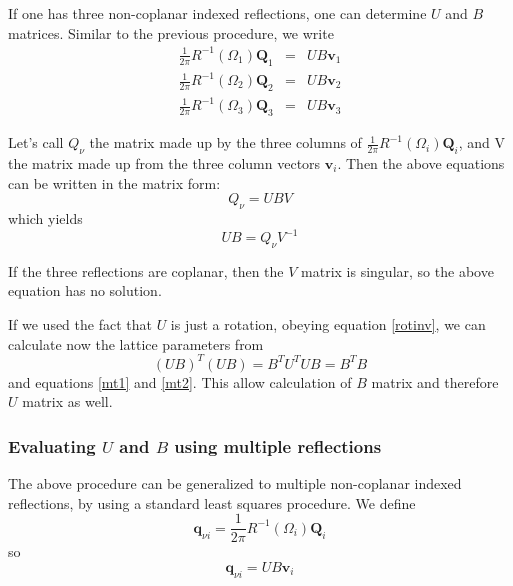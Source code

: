 \documentclass[prb]{revtex4}%
\begin{document}
If one has three non-coplanar indexed reflections, one can determine $U$ and $B$ matrices.
Similar to the previous procedure, we write
\begin{eqnarray}
  \frac{1}{2 \pi} R^{-1}(\Omega_1)\textbf{Q}_1 &=&   U B \textbf{v}_1 \\
  \frac{1}{2 \pi} R^{-1}(\Omega_2)\textbf{Q}_2 &=&   U B \textbf{v}_2 \\
  \frac{1}{2 \pi} R^{-1}(\Omega_3)\textbf{Q}_3 &=&   U B \textbf{v}_3
\end{eqnarray}

Let's call $Q_{\nu}$ the matrix made up by the three columns of $\frac{1}{2 \pi} R^{-1}(\Omega_i)\textbf{Q}_i$,
and V the matrix made up from the three column vectors $\textbf{v}_i$. Then the above equations
can be written in the matrix form:
\begin{equation}
   Q_{\nu} = U B V
\end{equation}
which yields
\begin{equation}
   U B = Q_{\nu}V^{-1}
\end{equation}

If the three reflections are coplanar, then the $V$ matrix is singular, so the above equation has
no solution.

If we used the fact that $U$ is just a rotation, obeying equation
\ref{rotinv}, we can calculate now the lattice parameters from
\begin{equation}
    (U B)^T (U B) = B^T U^T U B = B^T B
\end{equation}
and equations \ref{mt1} and \ref{mt2}. This allow calculation of $B$ matrix and therefore $U$ matrix as well.


\subsubsection{Evaluating $U$ and $B$ using multiple reflections}

The above procedure can be generalized to multiple non-coplanar indexed reflections, by using a
standard least squares procedure. We define
\begin{equation}
    \textbf{q}_{\nu i} = \frac{1}{2 \pi} R^{-1}(\Omega_i)\textbf{Q}_i
\end{equation}
so
\begin{equation}
    \textbf{q}_{\nu i} = U B \textbf{v}_i
\end{equation}
\end{document}
